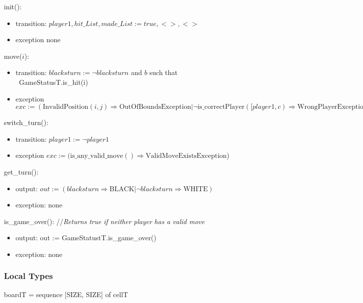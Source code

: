 \documentclass[12pt]{article}
\begin{document}
init():
\begin{itemize}
\item transition: 
$\mathit{player1}, hit\_List, made \_List := \mathit{true}, <>,<>$
\item exception
none
\end{itemize}

move($i$):
\begin{itemize}
\item transition: $\mathit{blacksturn} := \neg \mathit{blacksturn}$ and $b$ such that\\
\mbox{ GameStatusT.is\_hit(i)} 
\item exception
$exc := (\mbox{InvalidPosition}(i, j) \Rightarrow \mbox{OutOfBoundsException} | \neg \mbox{is\_correctPlayer}(\mathit{[player1}, c) \Rightarrow
\mbox{WrongPlayerException} )$
\end{itemize}

switch\_turn():
\begin{itemize}
\item transition: $\mathit{player1} := \neg \mathit{player1}$
\item exception $exc := (\mbox{is\_any\_valid\_move}() \Rightarrow \mbox{ValidMoveExistsException}$)
\end{itemize}

get\_turn():
\begin{itemize}
\item output: $\mathit{out} := (\mathit{blacksturn} \Rightarrow \mbox{BLACK} | \neg \mathit{blacksturn} \Rightarrow
\mbox{WHITE})$
\item exception: none
\end{itemize}

is\_game\_over(): //{\it Returns true if neither player has a valid move}
\begin{itemize}
\item output: 
out := GameStatustT.is\_game\_over()
\item exception: none
\end{itemize}

\subsubsection* {Local Types}

boardT = sequence [SIZE, SIZE] of cellT
\end{document}
